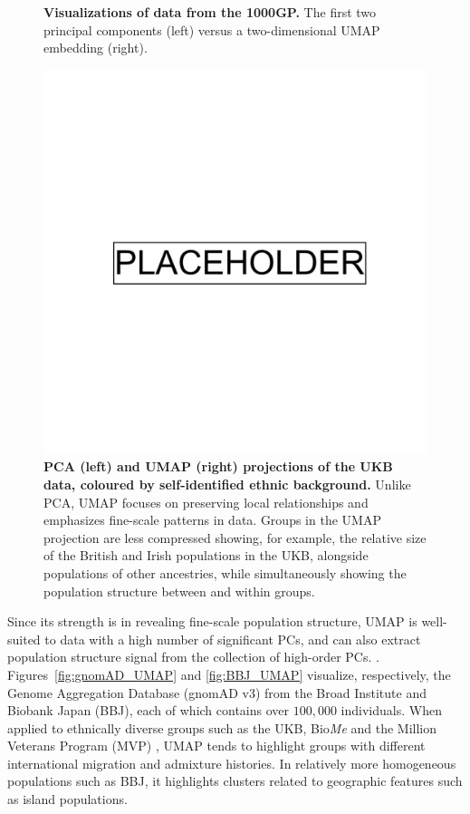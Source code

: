 \begin{figure}[h!]
\begin{subfigure}[b]{0.45\linewidth}
    \caption{}
    \label{fig:UMAP}
  \end{subfigure}
  \caption[PCA compared to UMAP of the 1KGP]{\textbf{Visualizations of data from the 1000GP.} The first two principal components (left) versus a two-dimensional UMAP embedding (right).}
  \label{fig:PCA_and_UMAP}
\end{figure}

\clearpage

\begin{figure}[h!]
  \centering
    \includegraphics[width=0.8\linewidth]{placeholder.png}
  \caption[PCA compared to UMAP of the UKB]{\textbf{PCA (left) and UMAP (right) projections of the UKB data, coloured by self-identified ethnic background.} Unlike PCA, UMAP focuses on preserving local relationships and emphasizes fine-scale patterns in data. Groups in the UMAP projection are less compressed showing, for example, the relative size of the British and Irish populations in the UKB, alongside populations of other ancestries, while simultaneously showing the population structure between and within groups.}
  \label{fig:UKB}
\end{figure}

\clearpage

Since its strength is in revealing fine-scale population structure, UMAP is well-suited to data with a high number of significant PCs, and can also extract population structure signal from the collection of high-order PCs. \citep{diaz-papkovich_umap_2019}.  Figures~\ref{fig:gnomAD_UMAP} and \ref{fig:BBJ_UMAP} visualize, respectively, the Genome Aggregation Database (gnomAD v3) from the Broad Institute\citep{karczewski_mutational_2020} and Biobank Japan (BBJ)\citep{nagai2017overview,sakaue_dimensionality_2020}, each of which contains over $100,000$ individuals. When applied to ethnically diverse groups such as the UKB, Bio\textit{Me}\citep{belbin_towards_2019} and the Million Veterans Program (MVP) \citep{hunter-zinck_genotyping_2020}, UMAP tends to highlight groups with different international migration and admixture histories. In relatively more homogeneous populations such as BBJ, it highlights clusters related to geographic features such as island populations.

